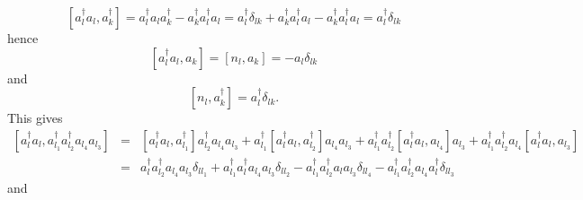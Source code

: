 \documentclass[12pt]{article}
\begin{document}
\begin{equation}
\left[ a_{l}^{\dagger }a_{l},a_{k}^{\dagger }\right] =a_{l}^{\dagger
}a_{l}a_{k}^{\dagger }-a_{k}^{\dagger }a_{l}^{\dagger }a_{l}=a_{l}^{\dagger
}\delta _{lk}+a_{k}^{\dagger }a_{l}^{\dagger }a_{l}-a_{k}^{\dagger
}a_{l}^{\dagger }a_{l}=a_{l}^{\dagger }\delta _{lk}
\end{equation}%
hence%
\begin{equation}
\left[ a_{l}^{\dagger }a_{l},a_{k}\right] =\left[ n_{l},a_{k}\right]
=-a_{l}\delta _{lk}
\end{equation}%
and 
\begin{equation}
\left[ n_{l},a_{k}^{\dagger }\right] =a_{l}^{\dagger }\delta _{lk}.
\end{equation}%
This gives 
\begin{eqnarray}
\left[ a_{l}^{\dagger }a_{l},a_{l_{1}}^{\dagger }a_{l_{2}}^{\dagger
}a_{l_{4}}a_{l_{3}}\right]  &=&\left[ a_{l}^{\dagger
}a_{l},a_{l_{1}}^{\dagger }\right] a_{l_{2}}^{\dagger
}a_{l_{4}}a_{l_{3}}+a_{l_{1}}^{\dagger }\left[ a_{l}^{\dagger
}a_{l},a_{l_{2}}^{\dagger }\right] a_{l_{4}}a_{l_{3}}+a_{l_{1}}^{\dagger
}a_{l_{2}}^{\dagger }\left[ a_{l}^{\dagger }a_{l},a_{l_{4}}\right]
a_{l_{3}}+a_{l_{1}}^{\dagger }a_{l_{2}}^{\dagger }a_{l_{4}}\left[
a_{l}^{\dagger }a_{l},a_{l_{3}}\right]  \\
&=&a_{l}^{\dagger }a_{l_{2}}^{\dagger }a_{l_{4}}a_{l_{3}}\delta
_{ll_{1}}+a_{l_{1}}^{\dagger }a_{l}^{\dagger }a_{l_{4}}a_{l_{3}}\delta
_{ll_{2}}-a_{l_{1}}^{\dagger }a_{l_{2}}^{\dagger }a_{l}a_{l_{3}}\delta
_{ll_{4}}-a_{l_{1}}^{\dagger }a_{l_{2}}^{\dagger }a_{l_{4}}a_{l}^{\dagger
}\delta _{ll_{3}}
\end{eqnarray}%
and 
\end{document}
